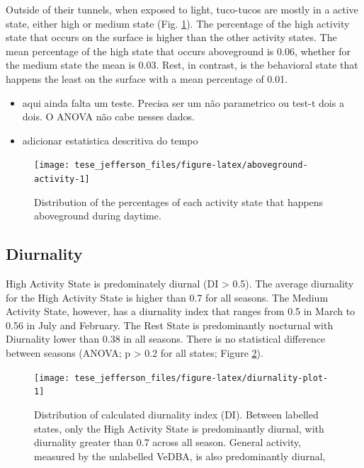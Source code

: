 \documentclass[english,msc,numbers,hidelinks]{coppe}
\providecommand{\tightlist}{%
  \setlength{\itemsep}{0pt}\setlength{\parskip}{0pt}}
\begin{document}
  Outside of their tunnels, when exposed to light, tuco-tucos are mostly in a active state, either high or medium state (Fig. \ref{fig:aboveground-activity}). The percentage of the high activity state that occurs on the surface is higher than the other activity states. The mean percentage of the high state that occurs aboveground is 0.06, whether for the medium state the mean is 0.03. Rest, in contrast, is the behavioral state that happens the least on the surface with a mean percentage of 0.01.\newline
  \begin{itemize}
  \tightlist
  \item
    aqui ainda falta um teste. Precisa ser um não parametrico ou test-t dois a dois. O ANOVA não cabe nesses dados.
  \item
    adicionar estatistica descritiva do tempo
  \end{itemize}
  \begin{figure}[H]

  {\centering \texttt{[image: tese\_jefferson\_files/figure-latex/aboveground-activity-1]} 

  }

  \caption{Distribution of the percentages of each activity state that happens aboveground during daytime.}\label{fig:aboveground-activity}
  \end{figure}
  \newpage

  \hypertarget{diurnality}{%
  \subsection{Diurnality}\label{diurnality}}

  High Activity State is predominately diurnal (DI \textgreater{} 0.5). The average diurnality for the High Activity State is higher than 0.7 for all seasons. The Medium Activity State, however, has a diurnality index that ranges from 0.5 in March to 0.56 in July and February. The Rest State is predominantly nocturnal with Diurnality lower than 0.38 in all seasons. There is no statistical difference between seasons (ANOVA; p \textgreater{} 0.2 for all states; Figure \ref{fig:diurnality-plot}). \newline
  \begin{figure}[H]

  {\centering \texttt{[image: tese\_jefferson\_files/figure-latex/diurnality-plot-1]} 

  }

  \caption{Distribution of calculated diurnality index (DI). Between labelled states, only the High Activity State is predominantly diurnal, with diurnality greater than 0.7 across all season. General activity, measured by the unlabelled VeDBA, is also predominantly diurnal, }\label{fig:diurnality-plot}
  \end{figure}
  \newpage
\end{document}
